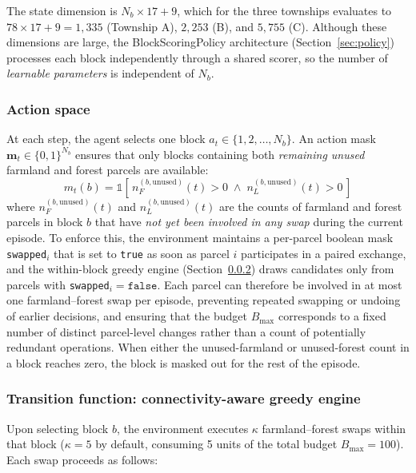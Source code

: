 \documentclass[preprint,12pt]{elsarticle}
\begin{document}
The state dimension is $N_b \times 17 + 9$, which for the three townships evaluates to $78 \times 17 + 9 = 1{,}335$ (Township A), $2{,}253$ (B), and $5{,}755$ (C). Although these dimensions are large, the BlockScoringPolicy architecture (Section~\ref{sec:policy}) processes each block independently through a shared scorer, so the number of \textit{learnable parameters} is independent of $N_b$.

\subsubsection{Action space}

At each step, the agent selects one block $a_t \in \{1, 2, \ldots, N_b\}$. An action mask $\mathbf{m}_t \in \{0, 1\}^{N_b}$ ensures that only blocks containing both \textit{remaining unused} farmland and forest parcels are available:
\begin{equation}
m_t(b) = \mathbb{1}\!\left[\,n_F^{(b,\text{unused})}(t) > 0 \;\wedge\; n_L^{(b,\text{unused})}(t) > 0\,\right]
\end{equation}
where $n_F^{(b,\text{unused})}(t)$ and $n_L^{(b,\text{unused})}(t)$ are the counts of farmland and forest parcels in block $b$ that have \textit{not yet been involved in any swap} during the current episode. To enforce this, the environment maintains a per-parcel boolean mask \texttt{swapped}$_i$ that is set to \texttt{true} as soon as parcel $i$ participates in a paired exchange, and the within-block greedy engine (Section~\ref{sec:greedy_engine}) draws candidates only from parcels with \texttt{swapped}$_i = \texttt{false}$. Each parcel can therefore be involved in at most one farmland--forest swap per episode, preventing repeated swapping or undoing of earlier decisions, and ensuring that the budget $B_{\max}$ corresponds to a fixed number of distinct parcel-level changes rather than a count of potentially redundant operations. When either the unused-farmland or unused-forest count in a block reaches zero, the block is masked out for the rest of the episode.

\subsubsection{Transition function: connectivity-aware greedy engine}
\label{sec:greedy_engine}

Upon selecting block $b$, the environment executes $\kappa$ farmland--forest swaps within that block ($\kappa = 5$ by default, consuming 5 units of the total budget $B_{\max} = 100$). Each swap proceeds as follows:
\end{document}
